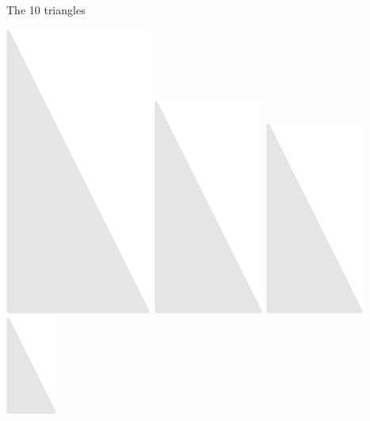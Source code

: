 \documentclass[14pt]{beamer}
\begin{document}
\begin{frame}{The 10 triangles}
\begin{center}
            \includegraphics[scale=0.3]{figures/figure024d.pdf}\quad
            \includegraphics[scale=0.3]{figures/figure024c.pdf}\quad
            \includegraphics[scale=0.3]{figures/figure024b.pdf}\quad
            \includegraphics[scale=0.3]{figures/figure024a.pdf}\\\bigskip\bigskip


\end{center}
\end{frame}
\end{document}
